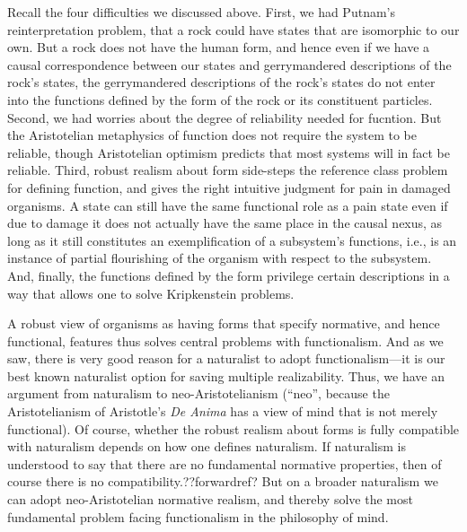 Recall the four difficulties we discussed above. First, we had Putnam's reinterpretation problem, that a rock
could have states that are isomorphic to our own. But a rock does not have the human form, and hence even if we 
have a causal correspondence between our states and gerrymandered descriptions of the rock's states, the gerrymandered
descriptions of the rock's states do not enter into the functions defined by the form of the rock or its constituent
particles. Second, we had worries about the degree of reliability needed for fucntion. But the Aristotelian metaphysics
of function does not require the system to be reliable, though Aristotelian optimism predicts that most systems will 
in fact be reliable. Third, robust realism about form side-steps the reference class problem for defining function,
and gives the right intuitive judgment for pain in damaged organisms. A state can still have the same functional 
role as a pain state even if due to damage it does not actually have the same place in the causal nexus, as long as 
it still constitutes an exemplification of a subsystem's functions, i.e., is an instance of partial flourishing of 
the organism with respect to the subsystem. And, finally, the functions defined by the form privilege certain
descriptions in a way that allows one to solve Kripkenstein problems.

A robust view of organisms as having forms that specify normative, and hence functional, features thus solves central
problems with functionalism. And as we saw, there is very good reason for a naturalist to adopt functionalism---it is our
best known naturalist option for saving multiple realizability. Thus, we have an argument from naturalism to neo-Aristotelianism (``neo'', because the Aristotelianism of Aristotle's \textit{De Anima} has a view of mind that is not merely functional). Of course, whether the robust realism about forms is fully compatible with naturalism depends
on how one defines naturalism.  If naturalism is understood to say that 
there are no fundamental normative properties, then of course there is no compatibility.??forwardref? But on a broader naturalism we can adopt neo-Aristotelian normative realism, and thereby solve the most fundamental problem facing functionalism
in the philosophy of mind.

